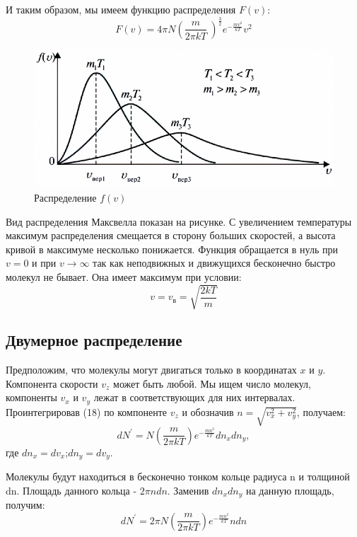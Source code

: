 \documentclass[a4paper,12pt]{article}
\begin{document}
И таким образом, мы имеем функцию распределения $F(v)$:
\begin{equation}
F\left(v\right)=4\pi N{\left(\frac{m}{2\pi kT}\ \right) }^\frac{3}{2}e^{-\frac{mv^2}{kT}}v^2
\end{equation}

\begin{figure}[h!]
\begin{center}
	\includegraphics[scale=0.6]{2}
\end{center}
\caption{Распределение $f(v)$}
\end{figure}
Вид распределения Максвелла показан на рисунке. С увеличением температуры максимум распределения смещается в сторону больших скоростей, а высота кривой в максимуме несколько понижается.
Функция обращается в нуль при $v=0$ и при $v \rightarrow \infty$ так как неподвижных и движущихся бесконечно быстро молекул не бывает. Она имеет максимум при условии:
$$v= v_в=\sqrt{\frac{2kT}{m}}$$

\newpage
\subsection{Двумерное распределение}
\hspace{\parindent}Предположим, что молекулы могут двигаться только в координатах $x$ и $y$. Компонента скорости $v_z$ может быть любой. Мы ищем число молекул, компоненты $v_x$ и $v_y$ лежат в соответствующих для них интервалах. Проинтегрировав (18) по компоненте $v_z$ и обозначив $n= \sqrt{v_x^2+v_y^2}$, получаем:
\begin{equation}
dN^\prime=N\left(\frac{m}{2\pi kT}\right)e^{-\frac{mn^2}{kT}}dn_xdn_y,
\end{equation}
где $dn_x=dv_x$;$dn_y=dv_y$.

Молекулы будут находиться в бесконечно тонком кольце радиуса n и толщиной dn. Площадь данного кольца - $2\pi ndn$. Заменив $dn_xdn_y$ на данную площадь, получим:
\begin{equation}
dN^\prime=2\pi N\left(\frac{m}{2\pi kT}\right)e^{-\frac{mn^2}{kT}}ndn
\end{equation}
\end{document}
